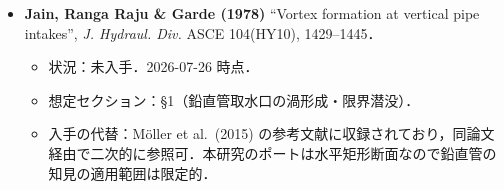 \documentclass[11pt]{jsarticle}
\begin{document}
\begin{itemize}
  \item \textbf{Jain, Ranga Raju \& Garde (1978)} ``Vortex formation at vertical pipe intakes'', \textit{J. Hydraul. Div.} ASCE 104(HY10), 1429--1445．
  \begin{itemize}
    \item 状況：未入手．2026-07-26 時点．
    \item 想定セクション：§1（鉛直管取水口の渦形成・限界潜没）．
    \item 入手の代替：M\"oller et al.\ (2015) の参考文献に収録されており，同論文経由で二次的に参照可．本研究のポートは水平矩形断面なので鉛直管の知見の適用範囲は限定的．
  \end{itemize}
\end{itemize}
\end{document}
